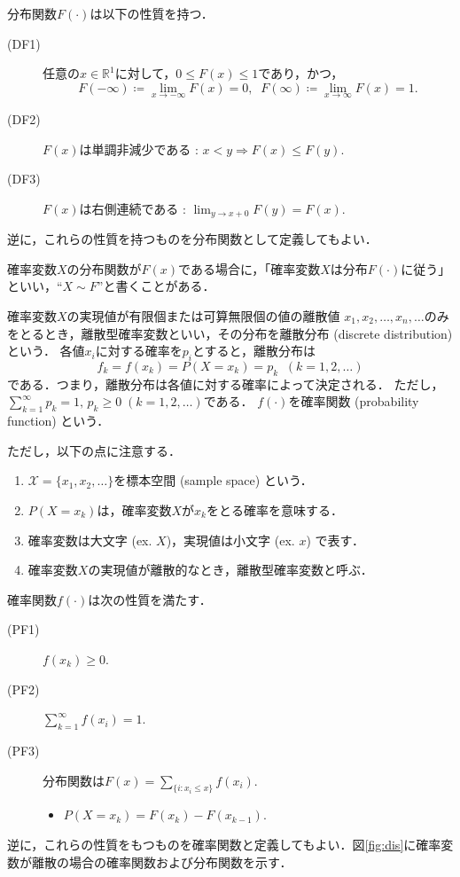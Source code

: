 \documentclass{jsreport}
\begin{document}
分布関数$F(\cdot)$は以下の性質を持つ．
\begin{description}
  \item[(DF1)] 任意の$x \in \mathbb{R}^1$に対して，$0 \leq F(x) \leq 1$であり，かつ，
  \begin{equation}
    F(-\infty) \coloneqq \lim_{x \to -\infty} F(x) = 0, \; \; F(\infty) \coloneqq \lim_{x \to \infty} F(x) = 1. \nonumber
  \end{equation}
  \item[(DF2)] $F(x)$は単調非減少である : $x < y \Longrightarrow F(x) \leq F(y).$
  \item[(DF3)] $F(x)$は右側連続である : $\lim_{y \to x + 0} F(y) = F(x).$
\end{description}
逆に，これらの性質を持つものを分布関数として定義してもよい．

確率変数$X$の分布関数が$F(x)$である場合に，「確率変数$X$は分布$F(\cdot)$に従う」といい，``$X \sim F$''と書くことがある．

\begin{screen}
  \begin{defi}[離散分布]
    確率変数$X$の実現値が有限個または可算無限個の値の離散値
    $x_1, x_2, \ldots, x_n, \ldots$のみをとるとき，離散型確率変数といい，その分布を離散分布 (discrete distribution) という．
    各値$x_i$に対する確率を$p_i$とすると，離散分布は
    \begin{equation}
      f_k = f(x_k) = P(X = x_k) = p_k \; \; (k = 1, 2, \ldots)
    \end{equation}
    である．つまり，離散分布は各値に対する確率によって決定される．
    ただし，$\sum_{k = 1}^{\infty} p_k = 1, \, p_k \geq 0 \; (k = 1, 2, \ldots)$である．
    $f(\cdot)$を確率関数 (probability function) という．
  \end{defi}
\end{screen}
ただし，以下の点に注意する．
\begin{enumerate}
  \item $\mathscr{X} = \{x_1, x_2, \ldots\}$を標本空間 (sample space) という．
  \item $P(X = x_k)$は，確率変数$X$が$x_k$をとる確率を意味する．
  \item 確率変数は大文字 (ex. $X$)，実現値は小文字 (ex. $x$) で表す．
  \item 確率変数$X$の実現値が離散的なとき，離散型確率変数と呼ぶ．
\end{enumerate}

確率関数$f(\cdot)$は次の性質を満たす．
\begin{description}
  \item[(PF1)] $f(x_k) \geq 0$.
  \item[(PF2)] $\sum_{k = 1}^{\infty} f(x_i) = 1$.
  \item[(PF3)] 分布関数は$F(x) = \sum_{\{i: x_i \leq x\}} f(x_i).$
  \begin{itemize}
    \item $P(X = x_k) = F(x_k) - F(x_{k-1})$.
  \end{itemize}
\end{description}
逆に，これらの性質をもつものを確率関数と定義してもよい．図\ref{fig:dis}に確率変数が離散の場合の確率関数および分布関数を示す．
\end{document}

